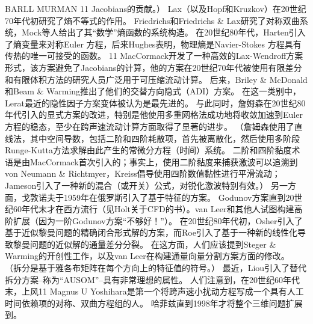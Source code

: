 \documentclass[UTF8,11pt,a4paper,openany,fontset=fandol]{ctexbook}
\begin{document}
BARLL MURMAN 11 Jacobians的贡献。） Lax（以及Hopf和Kruzkov）在20世纪70年代初研究了熵不等式的作用。 Friedrichs和Friedrichs \& Lax研究了对称双曲系统，Mock等人给出了其“数学”熵函数的系统构造。 在20世纪80年代，Harten引入了熵变量来对称Euler 方程，后来Hughes表明，物理熵是Navier-Stokes 方程具有传热的唯一可接受的函数。 11 MacCormack开发了一种高效的Lax-Wendroff方案形式，该方案避免了Jacobians的计算，他的方案在20世纪70年代被使用有限差分和有限体积方法的研究人员广泛用于可压缩流动计算。 后来，Briley \& McDonald和Beam \& Warming推出了他们的交替方向隐式（ADI）方案。 在这一类别中，Lerat最近的隐性因子方案变体被认为是最先进的。 与此同时，詹姆森在20世纪80年代引入的显式方案的改进，特别是他使用多重网格法成功地将收敛加速到Euler 方程的稳态，至少在跨声速流动计算方面取得了显著的进步。 （詹姆森使用了直线法，其中空间导数，包括二阶和四阶耗散项，首先被离散化，然后使用多阶段Runge-Kutta方法求解由此产生的常微分方程（时间）系统。 二阶和四阶黏度术语是由MacCormack首次引入的；事实上，使用二阶黏度来捕获激波可以追溯到von Neumann \& Richtmyer，Kreiss倡导使用四阶数值黏性进行平滑流动；Jameson引入了一种新的混合（或开关）公式，对锐化激波特别有效。） 另一方面，戈敦诺夫于1959年在俄罗斯引入了基于特征的方案。 Godunov方案直到20世纪60年代末才在西方流行（见Holt关于CFD的书）。van Leer和其他人试图构建高阶扩展（因为一阶Godunov方案“不够好！”）。 在20世纪80年代初，Osher引入了基于近似黎曼问题的精确闭合形式解的方案，而Roe引入了基于一种新的线性化导致黎曼问题的近似解的通量差分分裂。 在这方面，人们应该提到Steger \& Warming的开创性工作，以及van Leer在构建通量向量分割方案方面的修改。 （拆分是基于雅各布矩阵在每个方向上的特征值的符号。） 最近，Liou引入了替代拆分方案--称为“AUSOM”--具有非常理想的属性。 人们注意到，在20世纪60年代末，上风11 Magnus U Yoshihara是第一个将跨声速小扰动方程写成一个具有人工时间依赖项的对称、双曲方程组的人。 哈菲兹直到1998年才将整个三维问题扩展到。
\end{document}
